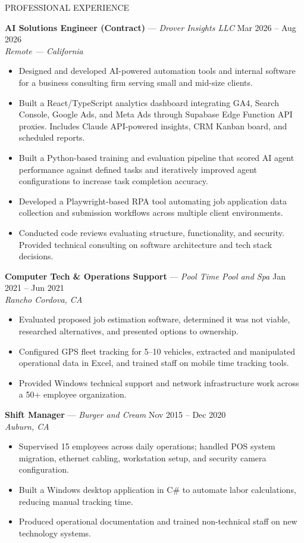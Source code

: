 \documentclass{resume}
\begin{document}
\begin{rSection}{PROFESSIONAL EXPERIENCE}

\textbf{AI Solutions Engineer (Contract)} --- \textit{Drover Insights LLC} \hfill Mar 2026 -- Aug 2026 \\
\textit{Remote --- California}
\begin{itemize}
    \item Designed and developed AI-powered automation tools and internal software for a business consulting firm serving small and mid-size clients.
    \item Built a React/TypeScript analytics dashboard integrating GA4, Search Console, Google Ads, and Meta Ads through Supabase Edge Function API proxies. Includes Claude API-powered insights, CRM Kanban board, and scheduled reports.
    \item Built a Python-based training and evaluation pipeline that scored AI agent performance against defined tasks and iteratively improved agent configurations to increase task completion accuracy.
    \item Developed a Playwright-based RPA tool automating job application data collection and submission workflows across multiple client environments.
    \item Conducted code reviews evaluating structure, functionality, and security. Provided technical consulting on software architecture and tech stack decisions.
\end{itemize}

\textbf{Computer Tech \& Operations Support} --- \textit{Pool Time Pool and Spa} \hfill Jan 2021 -- Jun 2021 \\
\textit{Rancho Cordova, CA}
\begin{itemize}
    \item Evaluated proposed job estimation software, determined it was not viable, researched alternatives, and presented options to ownership.
    \item Configured GPS fleet tracking for 5--10 vehicles, extracted and manipulated operational data in Excel, and trained staff on mobile time tracking tools.
    \item Provided Windows technical support and network infrastructure work across a 50+ employee organization.
\end{itemize}

\textbf{Shift Manager} --- \textit{Burger and Cream} \hfill Nov 2015 -- Dec 2020 \\
\textit{Auburn, CA}
\begin{itemize}
    \item Supervised 15 employees across daily operations; handled POS system migration, ethernet cabling, workstation setup, and security camera configuration.
    \item Built a Windows desktop application in C\# to automate labor calculations, reducing manual tracking time.
    \item Produced operational documentation and trained non-technical staff on new technology systems.
\end{itemize}

\end{rSection}
\end{document}
